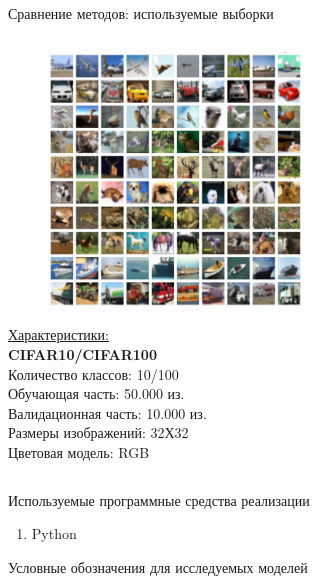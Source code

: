 \documentclass[10pt]{beamer}
\begin{document}
\begin{frame}{Сравнение методов: используемые выборки}
\begin{columns}
            \begin{column}{0.5\textwidth}
                \begin{figure}[H]
                    \centering
                    \includegraphics[width=0.6\textwidth]{pic3-2.pdf}
                \end{figure}
                \underline{Характеристики:}\\
                \textbf{CIFAR10/CIFAR100}\\
                Количество классов: 10/100\\
                Обучающая часть: 50.000 из.\\
                Валидационная часть: 10.000 из.\\
                Размеры изображений: 32Х32\\
                Цветовая модель: RGB
            \end{column}
        \end{columns}
        \end{frame}

        \begin{frame}{Используемые программные средства реализации}
            \begin{enumerate}
                \item Python
            \end{enumerate}
        \end{frame}

        \begin{frame}{Условные обозначения для исследуемых моделей}
            
        \end{frame}
\end{document}
